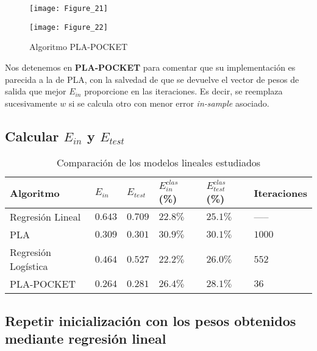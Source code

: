 \begin{figure}[H]
    \caption{Algoritmo PLA-POCKET \medskip}
    \begin{minipage}[b]{.5\linewidth}
      \centering
      \texttt{[image: Figure\_21]}
       \label{subfig-5:dummy65}
    \end{minipage}
    \hfill \hfill
    \begin{minipage}[b]{.5\linewidth}
      \centering
      \texttt{[image: Figure\_22]}
    \end{minipage}
    \label{fig:dummy65}
\end{figure}

Nos detenemos en \textbf{PLA-POCKET} para comentar que su implementación es
parecida a la de PLA, con la salvedad de que se devuelve el vector de pesos de
salida que mejor $E_{in}$ proporcione en las iteraciones. Es decir, se reemplaza
sucesivamente $w$ si se calcula otro con menor error \textit{in-sample} asociado.

\subsection{Calcular $E_{in}$ y $E_{test}$}

\begin{table}[H]
    \centering
    \begin{tabular}{llllll} \toprule
        Algoritmo & $E_{in}$ & $E_{test}$ & $E_{in}^{clas}$ (\%) & $E_{test}^{clas}$ (\%) & Iteraciones \\ \midrule
        Regresión Lineal& $0.643$ & $0.709$ & $22.8 \%$ & $25.1 \%$ & ----- \\ 
        PLA & $0.309$ & $0.301$ & $30.9 \%$ & $30.1 \%$ & $1000$ \\ 
        Regresión Logística & $0.464$ & $0.527$ & $22.2 \%$ & $26.0 \%$ & $552$ \\ 
        PLA-POCKET & $0.264$ & $0.281$ & $26.4 \%$ & $28.1 \%$ & $36$ \\ \bottomrule
    \end{tabular}
    \caption{Comparación de los modelos lineales estudiados}
\end{table}

\subsection{Repetir inicialización con los pesos obtenidos mediante regresión lineal}

